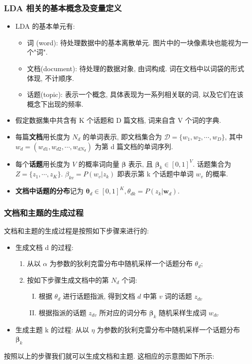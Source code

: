 \documentclass[UTF8]{article}
\begin{document}
\subsubsection{LDA 相关的基本概念及变量定义}
\begin{itemize}
\item LDA 的基本单元有:
	\begin{itemize}
	\item 词 (word): 待处理数据中的基本离散单元. 图片中的一块像素块也能视为一个"词".
	\item 文档(document): 待处理的数据对象, 由词构成. 词在文档中以词袋的形式体现, 不计顺序.
	\item 话题(topic): 表示一个概念, 具体表现为一系列相关联的词, 以及它们在该概念下出现的频率.
	\end{itemize}
\item 假定数据集中共含有 K 个话题和 D 篇文档, 词来自含 V 个词的字典.
\item 每篇\textbf{文档}用长度为 $N_d$ 的单词表示, 即文档集合为 $\mathcal{D}=\{w_1,w_2,\cdots, w_D\}$, 其中 $w_d=(w_{d1},w_{d2},\cdots,w_{dN_d})$ 为第 d 篇文档的单词序列.
\item 每个\textbf{话题}用长度为 $V$ 的概率词向量 $\bm{\beta}$ 表示, 且 $\bm{\beta}_k\in [0,1]^V$. 话题集合为 $Z=\{z_1,\cdots, z_K\}$. $\beta_{kv}=P(w_v|z_k)$ 即表示第 k 个话题中单词 $w_v$ 的概率.
\item \textbf{文档中话题的分布}记为 $\bm{\theta}_d\in[0,1]^K, \theta_{dk}=P(z_k|\bm{w}_d)$.
\end{itemize}
\subsubsection{文档和主题的生成过程}
文档和主题的生成过程是按照如下步骤来进行的:
\begin{itemize}
\item 生成文档 d 的过程:
	\begin{enumerate}[1. ]
	\item 从以 $\alpha$ 为参数的狄利克雷分布中随机采样一个话题分布 $\theta_d$;
	\item 按如下步骤生成文档中的第 $N_d$ 个词:
		\begin{enumerate}[I. ]
		\item 根据 $\theta_d$ 进行话题指派, 得到文档 $d$ 中第 $v$ 词的话题 $z_{dv}$
		\item 根据指派的话题 $z_{dv}$ 所对应的词分布 $\bm{\beta}_k$ 随机采样生成词 $w_{dv}$
		\end{enumerate}
	\end{enumerate}
\item 生成主题 k 的过程: 
	从以 $\eta$ 为参数的狄利克雷分布中随机采样一个话题分布 $\bm{\beta}_k$
\end{itemize}
按照以上的步骤我们就可以生成文档和主题. 这相应的示意图如下所示:
\end{document}
